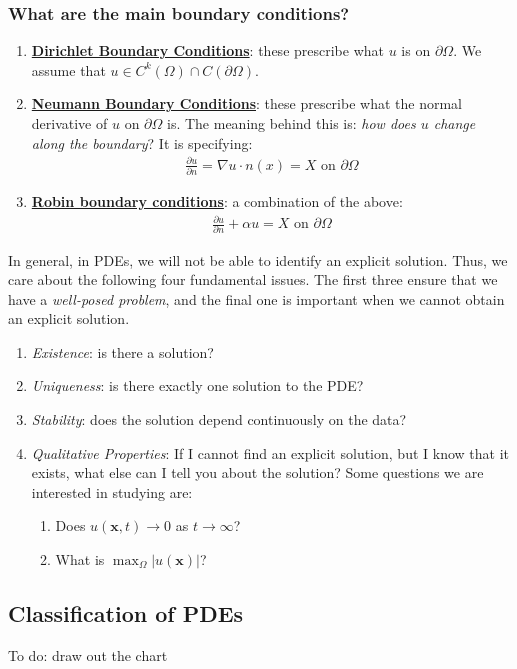 \documentclass[11pt]{scrartcl}
\theoremstyle{definition}
\theoremstyle{remark}
\newcommand{\dfn}[1]{\textbf{\underline{#1}}}
\newcommand{\vect}[1]{\mathbf{#1}}
\begin{document}
\subsubsection{What are the main boundary conditions?}
\begin{enumerate}[noitemsep]
	\item \dfn{Dirichlet Boundary Conditions}: these prescribe what $u$ is on $\partial \Omega$. We assume that $u \in C^k(\Omega) \cap C(\partial \Omega)$. 
	\item \dfn{Neumann Boundary Conditions}: these prescribe what the normal derivative of $u$ on $\partial \Omega$ is. The meaning behind this is: \emph{how does $u$ change along the boundary}? It is specifying:
	\begin{align}
		\frac{\partial u}{\partial n} = \nabla u \cdot n(x) = X \text{ on } \partial \Omega 	
	\end{align}
	\item \dfn{Robin boundary conditions}: a combination of the above: 
	\begin{align}
		\frac{\partial u}{\partial n} + \alpha u = X \text{ on } \partial \Omega 
	\end{align}
\end{enumerate}
In general, in PDEs, we will not be able to identify an explicit solution. Thus, we care about the following four fundamental issues. The first three ensure that we have a \emph{well-posed problem}, and the final one is important when we cannot obtain an explicit solution. 
\begin{enumerate}[noitemsep]
	\item \emph{Existence}: is there a solution? 
	\item \emph{Uniqueness}: is there exactly one solution to the PDE?
	\item \emph{Stability}: does the solution depend continuously on the data? 
	\item \emph{Qualitative Properties}: If I cannot find an explicit solution, but I know that it exists, what else can I tell you about the solution? Some questions we are interested in studying are: 
	\begin{enumerate}[noitemsep]
		\item Does $u(\vect{x}, t) \rightarrow 0$ as $t \rightarrow \infty$? 
		\item What is $\max_\Omega |u(\vect{x})|$? 
	\end{enumerate}
\end{enumerate}

\subsection{Classification of PDEs} 
To do: draw out the chart 
\end{document}

